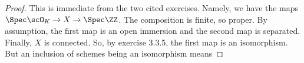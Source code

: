 \begin{proof}
	This is immediate from the two cited exercises. Namely, we have the maps $\Spec\scO_K \to X \to \Spec\ZZ$. The composition is finite, so proper. By assumption, the first map is an open immersion and the second map is separated. Finally, $X$ is connected. So, by exercise 3.3.5, the first map is an isomorphism. But an inclusion of schemes being an isomorphism means 
\end{proof}
